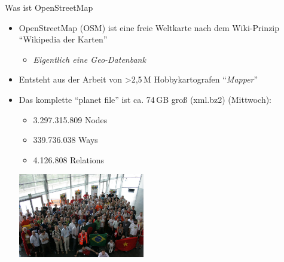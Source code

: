 \documentclass{beamer}
\begin{document}
\begin{frame}{Was ist OpenStreetMap}

\begin{itemize}
  \item OpenStreetMap (OSM) ist eine freie Weltkarte nach dem Wiki-Prinzip "`Wikipedia der Karten"'
    \begin{itemize}
      \item \emph{Eigentlich eine Geo-Datenbank}
    \end{itemize}
\pause
  \item Entsteht aus der Arbeit von \textgreater 2,5\,M Hobbykartografen "`\emph{Mapper}"'

 \item Das komplette "`planet file"' ist ca. 74\,GB groß (xml.bz2) (Mittwoch):
  \begin{itemize}
    \item 3.297.315.809 Nodes
    \item 339.736.038 Ways
    \item 4.126.808 Relations
  \end{itemize}

 \begin{center}
 \includegraphics[width=5.5cm]{sotm.jpg}
 \end{center}

\end{itemize}

\end{frame}
\end{document}
